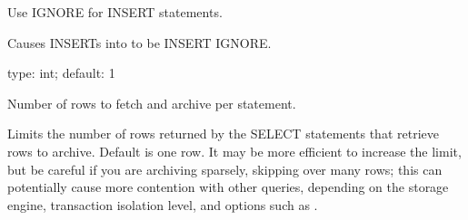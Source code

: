 \documentclass[letterpaper,10pt,english]{sphinxmanual}
\begin{document}
\begin{fulllineitems}
\label{\detokenize{mariadb-archiver:cmdoption-mariadb-archiver-ignore}}
Use IGNORE for INSERT statements.

Causes INSERTs into {\hyperref[\detokenize{mariadb-archiver:cmdoption-mariadb-archiver-dest}]{}} to be INSERT IGNORE.

\end{fulllineitems}


\begin{fulllineitems}
\label{\detokenize{mariadb-archiver:cmdoption-mariadb-archiver-limit}}
type: int; default: 1

Number of rows to fetch and archive per statement.

Limits the number of rows returned by the SELECT statements that retrieve rows
to archive.  Default is one row.  It may be more efficient to increase the
limit, but be careful if you are archiving sparsely, skipping over many rows;
this can potentially cause more contention with other queries, depending on the
storage engine, transaction isolation level, and options such as
{\hyperref[\detokenize{mariadb-archiver:cmdoption-mariadb-archiver-for-update}]{}}.

\end{fulllineitems}

\end{document}
